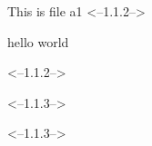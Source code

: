 
This is file a1
<--1.1.2-->

hello world

<--1.1.2-->

<--1.1.3-->

\begin{figure}
\end{figure}

<--1.1.3-->

